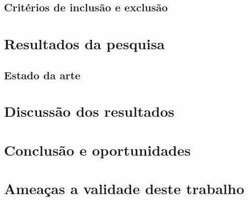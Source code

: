 \documentclass[10pt,journal,compsoc]{IEEEtran}
\begin{document}
\subsection{Critérios de inclusão e exclusão}
\label{sec:protocolo:inclusao}

\section{Resultados da pesquisa}
\label{sec:resultados}
\subsection{Estado da arte}


\section{Discussão dos resultados}
\label{sec:discussao}

\section{Conclusão e oportunidades}
\label{sec:conclusao}

\section{Ameaças a validade deste trabalho}
\label{sec:validade}

%
%
\end{document}
